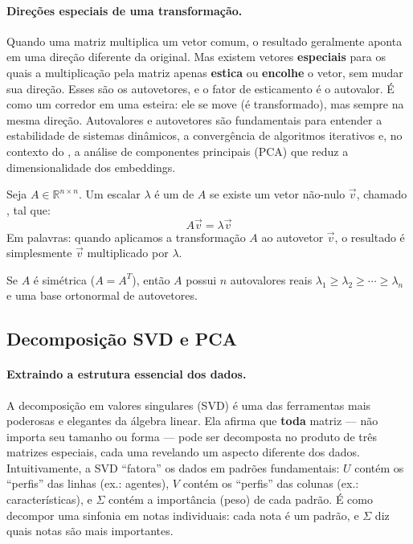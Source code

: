 \paragraph{Direções especiais de uma transformação.} Quando uma matriz
multiplica um vetor comum, o resultado geralmente aponta em uma direção
diferente da original. Mas existem vetores \textbf{especiais} para os quais
a multiplicação pela matriz apenas \textbf{estica} ou \textbf{encolhe} o
vetor, sem mudar sua direção. Esses são os autovetores, e o fator de
esticamento é o autovalor. É como um corredor em uma esteira: ele se move
(é transformado), mas sempre na mesma direção. Autovalores e autovetores são
fundamentais para entender a estabilidade de sistemas dinâmicos, a
convergência de algoritmos iterativos e, no contexto do \opencodeeco{}, a
análise de componentes principais (PCA) que reduz a dimensionalidade dos
embeddings.

\begin{definicao}
    Seja $A \in \mathbb{R}^{n \times n}$. Um escalar $\lambda$ é um
     de $A$ se existe um vetor não-nulo $\vec{v}$,
    chamado , tal que:
    \[
    A\vec{v} = \lambda \vec{v}
    \]
    Em palavras: quando aplicamos a transformação $A$ ao autovetor
    $\vec{v}$, o resultado é simplesmente $\vec{v}$ multiplicado por
    $\lambda$.
\end{definicao}

\begin{teorema}
    Se $A$ é simétrica ($A = A^T$), então $A$ possui $n$ autovalores reais
    $\lambda_1 \geq \lambda_2 \geq \cdots \geq \lambda_n$ e uma base
    ortonormal de autovetores.
\end{teorema}

\subsection{Decomposição SVD e PCA}

\paragraph{Extraindo a estrutura essencial dos dados.} A decomposição em
valores singulares (SVD) é uma das ferramentas mais poderosas e elegantes da
álgebra linear. Ela afirma que \textbf{toda} matriz --- não importa seu
tamanho ou forma --- pode ser decomposta no produto de três matrizes
especiais, cada uma revelando um aspecto diferente dos dados. Intuitivamente,
a SVD ``fatora'' os dados em padrões fundamentais: $U$ contém os ``perfis''
das linhas (ex.: agentes), $V$ contém os ``perfis'' das colunas (ex.:
características), e $\Sigma$ contém a importância (peso) de cada padrão.
É como decompor uma sinfonia em notas individuais: cada nota é um padrão,
e $\Sigma$ diz quais notas são mais importantes.

